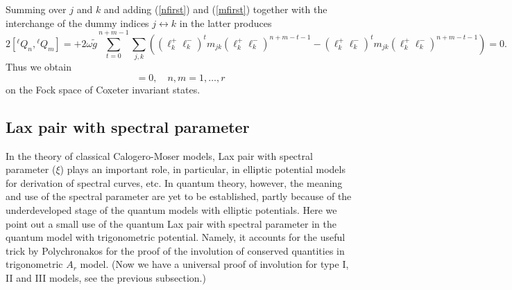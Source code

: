 \documentclass[a4paper,12pt]{article}
\begin{document}
Summing over \(j\) and \(k\) and adding (\ref{nfirst}) and
(\ref{mfirst})  together with the interchange of the
dummy indices
\(j\leftrightarrow k\) in the latter produces
\begin{equation}
   2[{}^{\ell}Q_n,{}^{\ell}Q_m]=
   +2\omega\tilde{g}
   \sum_{t=0}^{n+m-1}\sum_{j,k}\left((\ell_k^+\ell_k^-)^{t}m_{jk}
   (\ell_k^+\ell_k^-)^{n+m-t-1}
   -(\ell_k^+\ell_k^-)^{t}m_{jk}
   (\ell_k^+\ell_k^-)^{n+m-t-1}\right)=0.
\end{equation}
Thus we obtain
\begin{equation}
   [Q_n,Q_m]=0,\quad n,m=1,\ldots,r
\end{equation}
on the Fock space of Coxeter invariant states.

\bigskip
\subsection{Lax pair with spectral parameter}
\label{laxxi}
In the theory of classical Calogero-Moser models, Lax pair
with spectral parameter (\(\xi\)) plays an important role,
in particular, in elliptic potential models
\cite{Krichever,DHoker_Phong,bcs1,bcs2} for derivation of
spectral curves, etc.  In quantum theory, however, the meaning
and use of the spectral parameter are yet to be established,
partly because of the underdeveloped stage of the quantum models
with elliptic potentials.
Here we   point out a small use of the quantum Lax pair with spectral
parameter in the quantum model with trigonometric potential.
Namely, it accounts for
the useful trick by Polychronakos
\cite{Pol} for the proof of the involution of conserved
quantities in trigonometric
\(A_r\) model.
(Now we have a universal proof of involution for type I, II and III
models, see the previous subsection.)
\end{document}
